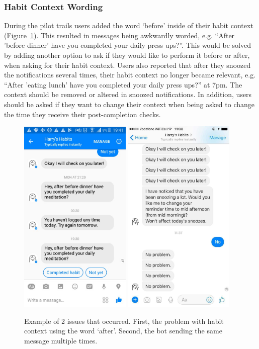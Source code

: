 \subsubsection*{Habit Context Wording}
During the pilot trails users added the word `before' inside of their habit context (Figure~\ref{fig:study_bot_issues}). This resulted in messages being awkwardly worded, e.g. ``After 'before dinner' have you completed your daily press ups?''. This would be solved by adding another option to ask if they would like to perform it before or after, when asking for their habit context. Users also reported that after they snoozed the notifications several times, their habit context no longer became relevant, e.g. ``After 'eating lunch' have you completed your daily press ups?'' at 7pm. The context should be removed or altered in snoozed notifications. In addition, users should be asked if they want to change their context when being asked to change the time they receive their post-completion checks.

\begin{figure}[H]
  \centering
  \includegraphics[width=2.1in]{../resources/feedback/after-before.jpg}
  \hspace{10px}
  \includegraphics[width=2.1in]{../resources/feedback/double-messages.jpg}
  \caption{Example of 2 issues that occurred. First, the problem with habit context using the word `after'. Second, the bot sending the same message multiple times.}
  \label{fig:study_bot_issues}
\end{figure}

